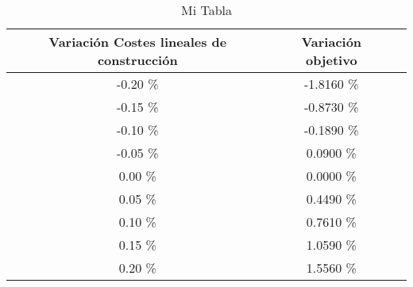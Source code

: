 \begin{table}
\centering
\begin{tabular}{|c|c|c|}
\hline
 Variación Costes lineales de construcción & Variación objetivo \\ \hline
-0.20 \% & -1.8160 \% \\ \hline
-0.15 \% & -0.8730 \% \\ \hline
-0.10 \% & -0.1890 \% \\ \hline
-0.05 \% & 0.0900 \% \\ \hline
0.00 \% & 0.0000 \% \\ \hline
0.05 \% & 0.4490 \% \\ \hline
0.10 \% & 0.7610 \% \\ \hline
0.15 \% & 1.0590 \% \\ \hline
0.20 \% & 1.5560 \% \\ \hline
\end{tabular}
\caption{Mi Tabla}
\end{table}
